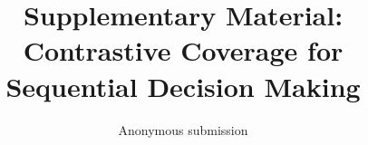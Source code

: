 \documentclass[letterpaper]{article}
\title{Supplementary Material:\\Contrastive Coverage for Sequential Decision Making}
\author{Anonymous submission}
\newif\ifofficial
\theoremstyle{definition}
\begin{document}
\maketitle






\ifofficial
  
\else
  
  
\fi
\end{document}
